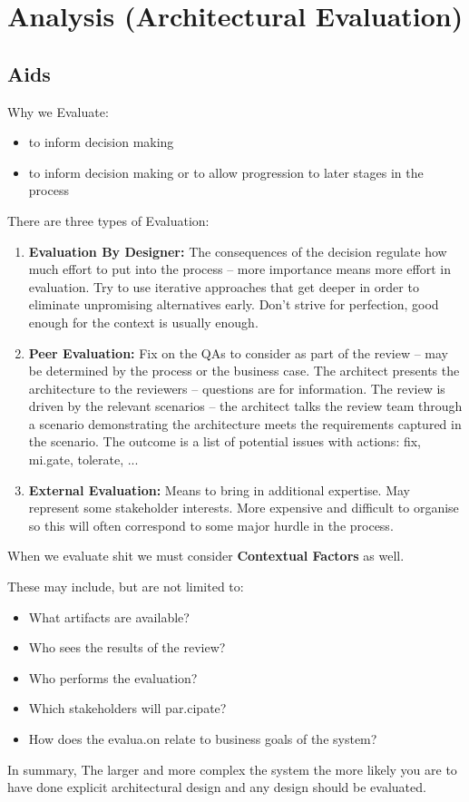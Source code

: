 \documentclass{memoir}
\begin{document}
\chapter{Analysis (Architectural Evaluation)}
\section{Aids}
Why we Evaluate:
\begin{itemize}
\item to inform decision making
\item to	inform	decision	making	or	to	allow	
progression	to	later	stages	in	the	process
\end{itemize}

There are three types of Evaluation:


\begin{enumerate}
\item \textbf{Evaluation By Designer:} The	consequences	of	the	decision	regulate	
how	much	effort	to	put	into	the	process	–	
more	importance	means	more	effort	in	
evaluation. Try	to	use	iterative	approaches	that	get	
deeper	in	order	to	eliminate	unpromising	
alternatives	early.  Don’t	strive	for	perfection,	good	enough	for	
the	context	is	usually	enough.	
\item \textbf{Peer Evaluation:} Fix	on	the	QAs	to	consider	as	part	of	the	review	–	
may	be	determined	by	the	process	or	the	
business	case. The	architect	presents	the	architecture	to	the	
reviewers	–	questions	are	for	information.	The	review	is	driven	by	the	relevant	scenarios	–	
the	architect	talks	the	review	team	through	a	
scenario	demonstrating	the	architecture	meets	
the	requirements	captured	in	the	scenario. The	outcome	is	a	list	of	potential	issues	with	
actions:	fix,	mi.gate,	tolerate,	...	
\item \textbf{External Evaluation:} Means	to	bring	in	additional	expertise. May	represent	some	stakeholder	interests. More	expensive	and	difficult	to	organise	so	
this	will	often	correspond	to	some	major	
hurdle	in	the	process.	
\end{enumerate}

When we evaluate shit we must consider \textbf{Contextual Factors} as well.

These may include, but are not limited to:
\begin{itemize}
\item What	artifacts	are	available?	
\item Who	sees	the	results	of	the	review?	
\item Who	performs	the	evaluation?	
\item Which	stakeholders	will	par.cipate?	
\item How	does	the	evalua.on	relate	to	business	
goals	of	the	system?	
\end{itemize}

In summary, The	larger	and	more	complex	the	system	the	
more	likely	you	are	to	have	done	explicit	
architectural	design	and	any	design	should	be	
evaluated.
\end{document}
